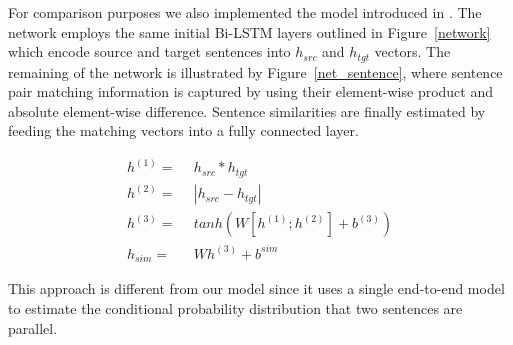 \documentclass[11pt,a4paper]{article}
\begin{document}


For comparison purposes we also implemented the model introduced in \cite{W17-2509}. The network employs the same initial Bi-LSTM layers outlined in Figure~\ref{network} which encode source and target sentences into $h_{src}$ and $h_{tgt}$ vectors. The remaining of the network is illustrated by Figure~\ref{net_sentence}, where sentence pair matching information is captured by using their element-wise product and absolute element-wise difference. Sentence similarities are finally estimated by feeding the matching vectors into a fully connected layer.

\begin{equation}
\begin{split}
h^{(1)} =  &\ \ h_{src} * h_{tgt} \\
h^{(2)} =  &\ \ |h_{src} - h_{tgt}| \\
h^{(3)} = &\ \ tanh(W[h^{(1)};h^{(2)}] + b^{(3)}) \\
h_{sim} = &\ \ Wh^{(3)} + b^{sim}
\end{split}
\end{equation}

This approach is different from our model since it uses a single end-to-end model to estimate the conditional probability distribution that two sentences are parallel. 
\end{document}
